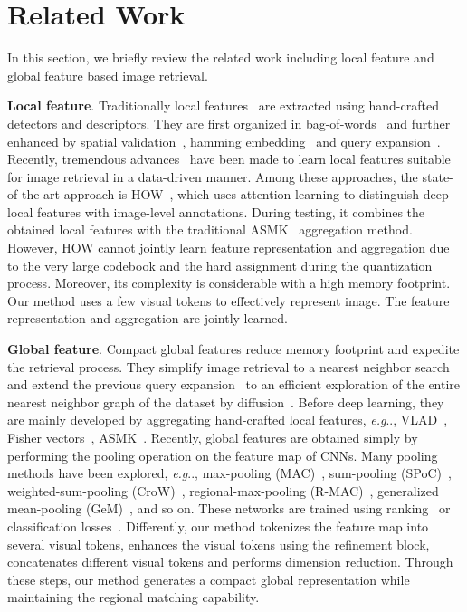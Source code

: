 \documentclass[letterpaper]{article} \usepackage{aaai22}  \usepackage{times}  \usepackage{helvet}  \usepackage{courier}  \usepackage[hyphens]{url}  \usepackage{graphicx} \urlstyle{rm} \def\UrlFont{\rm}  \usepackage{natbib}  \usepackage{caption} \DeclareCaptionStyle{ruled}{labelfont=normalfont,labelsep=colon,strut=off} \frenchspacing  \setlength{\pdfpagewidth}{8.5in}  \setlength{\pdfpageheight}{11in}  \usepackage{algorithm}
\makeatletter
\DeclareRobustCommand\onedot{\futurelet\@let@token\@onedot}
\def\@onedot{\ifx\@let@token.\else.\null\fi\xspace}
\def\eg{\emph{e.g}\onedot} \def\Eg{\emph{E.g}\onedot}
\makeatother
\begin{document}
\section{Related Work}\label{sec:relation work}
In this section, we briefly review the related work including local feature and global feature based image retrieval.

\noindent\textbf{Local feature}.
Traditionally local features~\cite{lowe2004distinctive,bay2006surf,liu2015uniting} are extracted using hand-crafted detectors and descriptors. 
They are first organized in bag-of-words~\cite{sivic2003video,zhou2010spatial} and further enhanced by spatial validation~\cite{philbin2007object}, hamming embedding~\cite{hammingembeding} and query expansion~\cite{chum2007total}. 
Recently, tremendous advances~\cite{HardNet2017,tolias2020learning,AffNet2017,noh2017large,Tian_2019_CVPR,cao2020unifying,Wu_2021_ICCV} have been made to learn local features suitable for image retrieval in a data-driven manner. 
Among these approaches, the state-of-the-art approach is HOW~\cite{tolias2020learning}, which uses attention learning to distinguish deep local features with image-level annotations. During testing, it combines the obtained local features with the traditional ASMK~\cite{tolias2013aggregate} aggregation method. 
However, HOW cannot jointly learn feature representation and aggregation due to the very large codebook and the hard assignment during the quantization process. 
Moreover, its complexity is considerable with a high memory footprint. 
Our method uses a few visual tokens to effectively represent image. The feature representation and aggregation are jointly learned.

\noindent\textbf{Global feature}.
Compact global features reduce memory footprint and expedite the retrieval process.
They simplify image retrieval to a nearest neighbor search and extend the previous query expansion~\cite{chum2007total} to an efficient exploration of the entire nearest neighbor graph of the dataset by diffusion~\cite{aaai2}.
Before deep learning, they are mainly developed by aggregating hand-crafted local features, \eg, VLAD~\cite{jegou2011aggregating}, Fisher vectors~\cite{fisher_vector}, ASMK~\cite{tolias2013aggregate}. 
Recently, global features are obtained simply by performing the pooling operation on the feature map of CNNs. 
Many pooling methods have been explored, \eg, max-pooling (MAC)~\cite{tolias:hal-01842218}, sum-pooling (SPoC)~\cite{Babenko_2015_ICCV}, weighted-sum-pooling (CroW)~\cite{kalantidis2016cross}, regional-max-pooling (R-MAC)~\cite{tolias:hal-01842218}, generalized mean-pooling (GeM)~\cite{radenovic2018fine}, and so on. 
These networks are trained using ranking~\cite{radenovic2018fine,revaud2019learning} or classification losses~\cite{Deng_2019_CVPR}. 
Differently, our method tokenizes the feature map into several visual tokens, enhances the visual tokens using the refinement block, concatenates different visual tokens and performs dimension reduction. Through these steps, our method generates a compact global representation while maintaining the regional matching capability.
\end{document}
